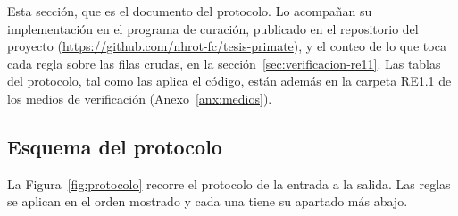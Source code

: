  Esta sección, que es el documento del protocolo.
Lo acompañan su implementación en el programa de curación, publicado en el
repositorio del proyecto (\url{https://github.com/nhrot-fc/tesis-primate}), y el
conteo de lo que toca cada regla sobre las \nRawRows{} filas crudas, en la
sección~\ref{sec:verificacion-re11}. Las tablas del protocolo, tal como las aplica
el código, están además en la carpeta RE1.1 de los medios de verificación
(Anexo~\ref{anx:medios}).

\subsection{Esquema del protocolo}

La Figura~\ref{fig:protocolo} recorre el protocolo de la entrada a la salida. Las
reglas se aplican en el orden mostrado y cada una tiene su apartado más abajo.

